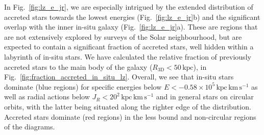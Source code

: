 \documentclass[fleqn,usenatbib]{mnras}
\begin{document}
In Fig.~\ref{fig:lz_e_jr}, we are especially intrigued by the extended distribution of accreted stars towards the lowest energies (Fig.~\ref{fig:lz_e_jr}b) and the significant overlap with the inner in-situ galaxy (Fig.~\ref{fig:lz_e_jr}a). These are regions that are not extensively explored by surveys of the Solar neighbourhood, but are expected to contain a significant fraction of accreted stars, well hidden within a labyrinth of in-situ stars. We have calculated the relative fraction of previously accreted stars to the main body of the galaxy ($R_\mathrm{3D} < 50\,\mathrm{kpc}$), in Fig.~\ref{fig:fraction_accreted_in_situ_lz}. Overall, we see that in-situ stars dominate (blue regions) for specific energies below $E < -0.58\times10^{5}\,\mathrm{kpc\,km\,s^{-1}}$ as well as radial actions below $J_R < 20^2\,\mathrm{kpc\,km\,s^{-1}}$ and in general stars on circular orbits, with the latter being situated along the righter edge of the distribution. Accreted stars dominate (red regions) in the less bound and non-circular regions of the diagrams.
\end{document}
